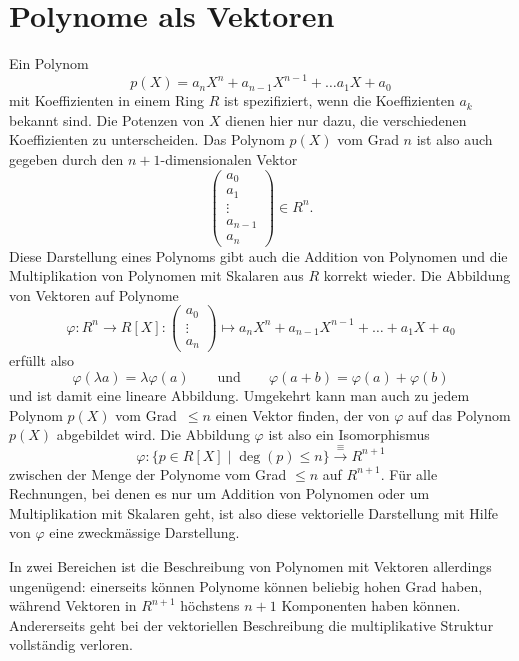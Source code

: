 %
%
%
\section{Polynome als Vektoren
\label{buch:section:polynome:vektoren}}
Ein Polynom
\[
p(X) = a_nX^n + a_{n-1}X^{n-1} + \dots a_1X+a_0
\]
mit Koeffizienten in einem Ring $R$
ist spezifiziert, wenn die Koeffizienten $a_k$ bekannt sind.
Die Potenzen von $X$ dienen hier nur dazu, die verschiedenen
Koeffizienten zu unterscheiden.
Das Polynom $p(X)$ vom Grad $n$ ist also auch gegeben durch den
$n+1$-dimensionalen Vektor
\[
\begin{pmatrix}
a_0\\
a_1\\
\vdots\\
a_{n-1}\\
a_{n}
\end{pmatrix}
\in
R^n.
\]
Diese Darstellung eines Polynoms gibt auch die Addition von Polynomen
und die Multiplikation von Polynomen mit Skalaren aus $R$ korrekt wieder.
Die Abbildung von Vektoren auf Polynome
\[
\varphi
\colon  R^n \to R[X]
:
\begin{pmatrix}a_0\\\vdots\\a_n\end{pmatrix}
\mapsto
a_nX^n + a_{n-1}X^{n-1}+\dots+a_1X+a_0
\]
erfüllt also
\[
\varphi( \lambda a) = \lambda \varphi(a)
\qquad\text{und}\qquad
\varphi(a+b) = \varphi(a) + \varphi(b)
\]
und ist damit eine lineare Abbildung.
Umgekehrt kann man auch zu jedem Polynom $p(X)$ vom Grad~$\le n$ einen
Vektor finden, der von $\varphi$ auf das Polynom $p(X)$ abgebildet wird.
Die Abbildung $\varphi$ ist also ein Isomorphismus
\[
\varphi
\colon
\{p\in R[X]\;|\; \deg(p) \le n\}
\overset{\equiv}{\to}
R^{n+1}
\]
zwischen der Menge
der Polynome vom Grad $\le n$ auf $R^{n+1}$.
Für alle Rechnungen, bei denen es nur um Addition von Polynomen oder
um Multiplikation mit Skalaren geht, ist also diese vektorielle Darstellung
mit Hilfe von $\varphi$ eine zweckmässige Darstellung.

In zwei Bereichen ist die Beschreibung von Polynomen mit Vektoren allerdings
ungenügend: einerseits können Polynome können beliebig hohen Grad haben,
während Vektoren in $R^{n+1}$ höchstens $n+1$ Komponenten haben können.
Andererseits geht bei der vektoriellen Beschreibung die multiplikative
Struktur vollständig verloren.

